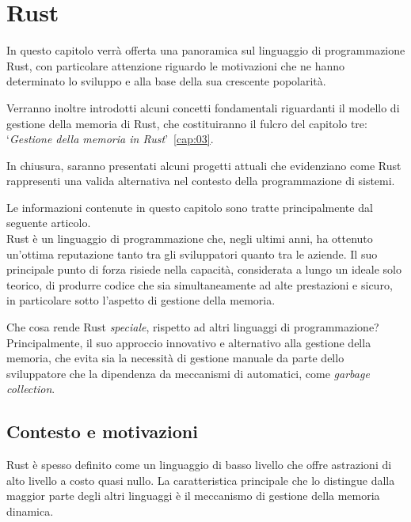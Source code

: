 
\chapter{Rust}\label{cap:02}

In questo capitolo verrà offerta una panoramica sul linguaggio di programmazione Rust, con particolare attenzione riguardo
le motivazioni che ne hanno determinato lo sviluppo e alla base della sua crescente popolarità.

Verranno inoltre introdotti alcuni concetti fondamentali riguardanti il modello di gestione della memoria di Rust, 
che costituiranno il fulcro del capitolo tre: `\textit{Gestione della memoria in Rust}'~\ref{cap:03}.

In chiusura, saranno presentati alcuni progetti attuali che evidenziano come Rust rappresenti una valida alternativa nel contesto della programmazione di sistemi.

Le informazioni contenute in questo capitolo sono tratte principalmente dal seguente articolo\cite{rust-2023-interview}.
\vspace{15pt}\\
\noindent Rust è un linguaggio di programmazione che, negli ultimi anni, ha ottenuto un'ottima reputazione  
tanto tra gli sviluppatori quanto tra le aziende. Il suo principale punto di forza risiede nella 
capacità, considerata a lungo un ideale solo teorico, di produrre codice che sia simultaneamente 
ad alte prestazioni e sicuro, in particolare sotto l'aspetto di gestione della memoria.

Che cosa rende Rust \textit{speciale}, rispetto ad altri linguaggi di programmazione? Principalmente, il suo approccio innovativo e alternativo alla gestione della memoria, che evita sia la necessità di gestione manuale da parte dello sviluppatore che la dipendenza da meccanismi di automatici, come \textit{garbage collection}.

\section{Contesto e motivazioni}
Rust è spesso definito come un linguaggio di basso livello 
che offre astrazioni di alto livello a costo quasi nullo.
La caratteristica principale che lo distingue dalla maggior parte degli altri linguaggi è il meccanismo
 di gestione della memoria dinamica. 

